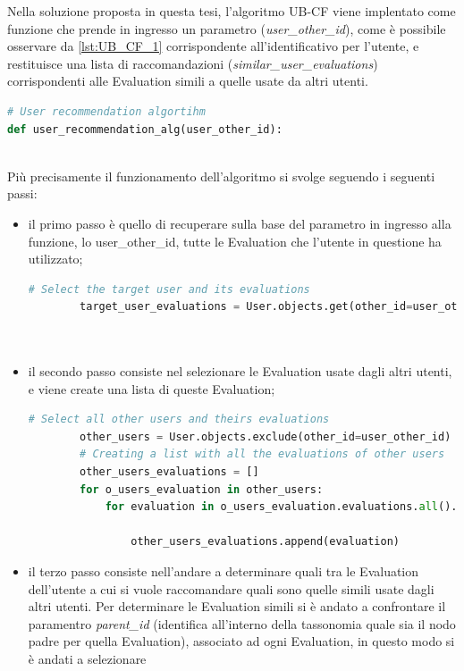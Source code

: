 Nella soluzione proposta in questa tesi, l'algoritmo UB-CF viene implentato come funzione che prende in ingresso un parametro 
(\textit{user\_other\_id}), come è possibile osservare da \ref{lst:UB_CF_1} corrispondente all'identificativo per l'utente, 
e restituisce una lista di raccomandazioni (\textit{similar\_user\_evaluations}) corrispondenti alle Evaluation simili a quelle usate da altri utenti. 

\lstset{style=python_code_style}
\begin{lstlisting}[language=Python, label=lst:UB_CF_1]
# User recommendation algortihm
def user_recommendation_alg(user_other_id):
\end{lstlisting}
\ \\
Più precisamente il funzionamento dell'algoritmo si svolge seguendo i seguenti passi:
\begin{itemize}
	\item il primo passo è quello di recuperare sulla base del parametro in ingresso alla funzione, lo user\_other\_id,
	tutte le Evaluation che l'utente in questione ha utilizzato;
	\begin{lstlisting}[language=Python, label=lst:UB_CF_2]
		# Select the target user and its evaluations
		target_user_evaluations = User.objects.get(other_id=user_other_id).evaluations.all()\
																					.values('other_id', 'id', 'parent_id')\
																					.order_by('other_id')
	\end{lstlisting}
	\item il secondo passo consiste nel selezionare le Evaluation usate dagli altri utenti, e viene create una lista di queste Evaluation;
	\begin{lstlisting}[language=Python, label=lst:UB_CF_3]
		# Select all other users and theirs evaluations
		other_users = User.objects.exclude(other_id=user_other_id)
		# Creating a list with all the evaluations of other users
		other_users_evaluations = []
		for o_users_evaluation in other_users:
			for evaluation in o_users_evaluation.evaluations.all().values('other_id', 'id', 'parent_id')\
																	.order_by('other_id'):
				other_users_evaluations.append(evaluation)
	\end{lstlisting}
	\item il terzo passo consiste nell'andare a determinare quali tra le Evaluation dell'utente a cui si vuole raccomandare quali sono quelle 
	simili usate dagli altri utenti. Per determinare le Evaluation simili si è andato a confrontare il paramentro \textit{parent\_id} (identifica
	all'interno della tassonomia quale sia il nodo padre per quella Evaluation), associato ad ogni Evaluation, in questo modo si è andati a selezionare

\end{itemize}
